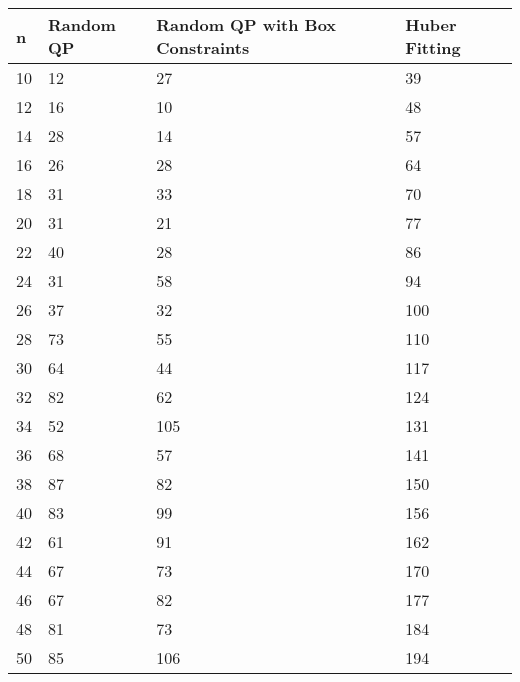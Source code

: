 \begin{tabular}{llll}
n & Random QP & Random QP with Box Constraints & Huber Fitting \\ 
\hline 
10 & 12 & 27 & 39 \\ 
12 & 16 & 10 & 48 \\ 
14 & 28 & 14 & 57 \\ 
16 & 26 & 28 & 64 \\ 
18 & 31 & 33 & 70 \\ 
20 & 31 & 21 & 77 \\ 
22 & 40 & 28 & 86 \\ 
24 & 31 & 58 & 94 \\ 
26 & 37 & 32 & 100 \\ 
28 & 73 & 55 & 110 \\ 
30 & 64 & 44 & 117 \\ 
32 & 82 & 62 & 124 \\ 
34 & 52 & 105 & 131 \\ 
36 & 68 & 57 & 141 \\ 
38 & 87 & 82 & 150 \\ 
40 & 83 & 99 & 156 \\ 
42 & 61 & 91 & 162 \\ 
44 & 67 & 73 & 170 \\ 
46 & 67 & 82 & 177 \\ 
48 & 81 & 73 & 184 \\ 
50 & 85 & 106 & 194 \\ 
\hline 
\end{tabular}